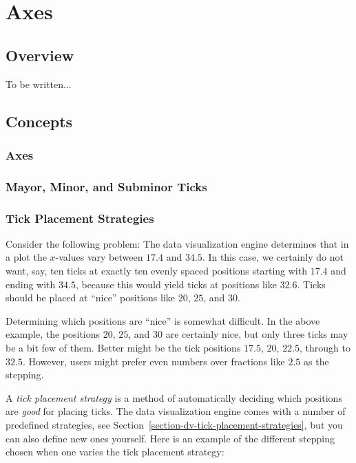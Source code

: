 %
%
%


\section{Axes}
\label{section-dv-axes}

\subsection{Overview}

To be written...


\subsection{Concepts}

\subsubsection{Axes}

\subsubsection{Mayor, Minor, and Subminor Ticks}

\subsubsection{Tick Placement Strategies}

Consider the following problem: The data visualization engine determines that in a
plot the $x$-values vary between $17.4$ and $34.5$. In this case, we 
certainly do not want, say, ten ticks at exactly ten evenly spaced
positions starting with $17.4$ and ending with $34.5$, because this
would yield ticks at positions like $32.6$. Ticks should be placed at
``nice'' positions like $20$, $25$, and $30$.

Determining which positions are ``nice'' is somewhat difficult. In the
above example, the positions $20$, $25$, and $30$ are certainly nice,
but only three ticks may be a bit few of them. Better might be the
tick positions $17.5$, $20$, $22.5$, through to $32.5$. However, users
might prefer even numbers over fractions like $2.5$ as the stepping.

A \emph{tick placement strategy} is a method of automatically deciding
which positions are \emph{good} for placing ticks. The data
visualization engine comes with a number of predefined strategies, see
Section~\ref{section-dv-tick-placement-strategies}, but you can also
define new ones yourself.
Here is an example of the different stepping chosen when one varies
the tick placement strategy:

